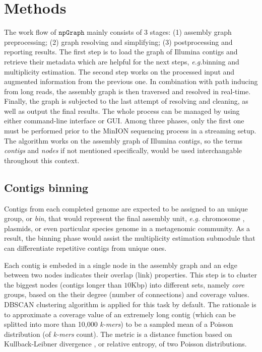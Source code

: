 \documentclass[10pt,twocolumn,twoside]{genpaper}
\newcommand{\npgraph}{$\mathtt{npGraph}$}
\newcommand{\EG}{\emph{e.g.}}
\begin{document}
\section*{Methods}

The work flow of \npgraph{} mainly consists of 3 stages: (1) assembly graph preprocessing; (2) graph resolving and simplifying; (3) postprocessing and reporting results. 
The first step is to load the graph of Illumina contigs and retrieve their metadata which are helpful for the next steps, \EG binning and multiplicity estimation.
The second step works on the processed input and augmented information from the previous one. In combination with path inducing from long reads, the assembly graph is then traversed and resolved in real-time.
Finally, the graph is subjected to the last attempt of resolving and cleaning, as well as output the final results. The whole process can be managed by using either command-line interface or GUI.
Among three phases, only the first one must be performed prior to the MinION sequencing process in a streaming setup.
The algorithm works on the assembly graph of Illumina contigs, so the terms \emph{contigs} and \emph{nodes} if not mentioned specifically, would be used interchangable throughout this context.
\subsection*{Contigs binning}
Contigs from each completed genome are expected to be assigned to an unique group, or \emph{bin}, that would represent the final assembly unit, \EG{} chromosome , plasmids, or even particular species genome in a metagenomic community. As a result, the binning phase would assist the multiplicity estimation submodule that can differentiate repetitive contigs from unique ones. 

Each contig is embeded in a single node in the assembly graph and an edge between two nodes indicates their overlap (link) properties.
This step is to cluster the biggest nodes (contigs longer than $10$Kbp) into different sets, namely \emph{core} groups, based on the their degree (number of connections) and coverage values.
DBSCAN clustering algorithm \cite{Ester96adensity-based} is applied for this task by default.
The rationale is to approximate a coverage value of an extremely long contig (which can be splitted into more than 10,000 \emph{k-mers}) to be a sampled mean of a Poisson distribution (of \emph{k-mers} count). 
The metric is a distance function based on Kullback-Leibner divergence \cite{Kullback1951information}, or relative entropy, of two Poisson distributions. 
\end{document}
